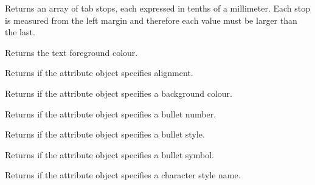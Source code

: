 
Returns an array of tab stops, each expressed in tenths of a millimeter. Each stop
is measured from the left margin and therefore each value must be larger than the last.

\label{wxrichtextattrgettextcolour}


Returns the text foreground colour.

\label{wxrichtextattrhasalignment}


Returns \true if the attribute object specifies alignment.

\label{wxrichtextattrhasbackgroundcolour}


Returns \true if the attribute object specifies a background colour.

\label{wxrichtextattrhasbulletnumber}


Returns \true if the attribute object specifies a bullet number.

\label{wxrichtextattrhasbulletstyle}


Returns \true if the attribute object specifies a bullet style.

\label{wxrichtextattrhasbulletsymbol}


Returns \true if the attribute object specifies a bullet symbol.

\label{wxrichtextattrhascharacterstylename}


Returns \true if the attribute object specifies a character style name.

\label{wxrichtextattrhasfacename}

